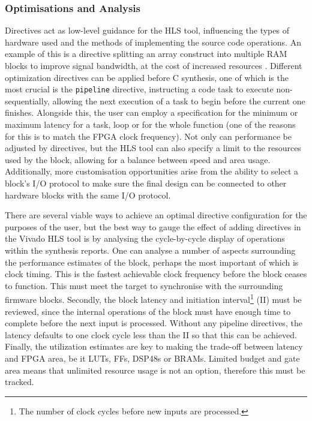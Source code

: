 \documentclass[10pt]{article}
\begin{document}
\subsubsection{Optimisations and Analysis}\label{direct}

Directives act as low-level guidance for the HLS tool, influencing the types of hardware used and the methods of implementing the source code operations. An example of this is a directive splitting an array construct into multiple RAM blocks to improve signal bandwidth, at the cost of increased resources \cite{lo2016model}. Different optimization directives can be applied before C synthesis, one of which is the most crucial is the \texttt{pipeline} directive, instructing a code task to execute non-sequentially, allowing the next execution of a task to begin before the current one finishes. Alongside this, the user can employ a specification for the minimum or maximum latency for a task, loop or for the whole function (one of the reasons for this is to match the FPGA clock frequency). Not only can performance be adjusted by directives, but the HLS tool can also specify a limit to the resources used by the block, allowing for a balance between speed and area usage. Additionally, more customisation opportunities arise from the ability to select a block's I/O protocol to make sure the final design can be connected to other hardware blocks with the same I/O protocol.

There are several viable ways to achieve an optimal directive configuration for the purposes of the user, but the best way to gauge the effect of adding directives in the Vivado HLS tool is by analysing the cycle-by-cycle display of operations within the synthesis reports. One can analyse a number of aspects surrounding the performance estimates of the block, perhaps the most important of which is clock timing. This is the fastest achievable clock frequency before the block ceases to function. This must meet the target to synchronise with the surrounding firmware blocks. Secondly, the block latency and initiation interval\footnote{The number of clock cycles before new inputs are processed.} (II) must be reviewed, since the internal operations of the block must have enough time to complete before the next input is processed. Without any pipeline directives, the latency defaults to one clock cycle less than the II so that this can be achieved. Finally, the utilization estimates are key to making the trade-off between latency and FPGA area, be it LUTs, FFs, DSP48s or BRAMs. Limited budget and gate area means that unlimited resource usage is not an option, therefore this must be tracked.
\end{document}
